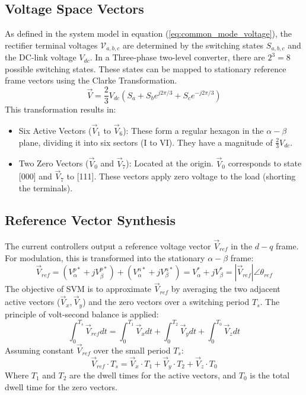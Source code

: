 \subsection{Voltage Space Vectors}
As defined in the system model in equation (\ref{eq:common_mode_voltage}), the rectifier terminal voltages $\mathcal{V}_{a,b,c}$
are determined by the switching states $S_{a,b,c}$ and the DC-link voltage $V_{dc}$. In a Three-phase two-level converter,
there are $2^3 = 8$ possible switching states. These states can be mapped to stationary reference frame vectors using the Clarke Transformation.
\begin{equation}
    \vec{V} = \frac{2}{3} V_{dc} (S_a + S_b e^{j2\pi/3} + S_c e^{-j2\pi/3})
    \label{eq:volage_vector}
\end{equation}
This transformation results in:
\begin{itemize}
    \item Six Active Vectors ($\vec{V}_1$ to $\vec{V}_6$): These form a regular hexagon in the $\alpha-\beta$ plane,
          dividing it into six sectors (I to VI). They have a magnitude of $\frac{2}{3}V_{dc}$.
    \item Two Zero Vectors ($\vec{V}_0$ and $\vec{V}_7$): Located at the origin. $\vec{V}_0$ corresponds to state [000]
          and $\vec{V}_7$ to [111]. These vectors apply zero voltage to the load (shorting the terminals).
\end{itemize}
\subsection{Reference Vector Synthesis}
The current controllers output a reference voltage vector $\vec{V}_{ref}$ in the $d-q$ frame.
For modulation, this is transformed into the stationary $\alpha-\beta$ frame:
\begin{equation}
    \vec{V}_{ref} = (V_{\alpha}^{p*} + jV_{\beta}^{p*})+(V_{\alpha}^{n*} + jV_{\beta}^{n*})=V_{\alpha}^* + jV_{\beta}^* = |\vec{V}_{ref}| \angle \theta_{ref}
    \label{eq:reference_vector}
\end{equation}
The objective of SVM is to approximate $\vec{V}_{ref}$ by averaging the two adjacent active vectors ($\vec{V}_x, \vec{V}_y$)
and the zero vectors over a switching period $T_s$. The principle of volt-second balance is applied:
\begin{equation}
    \int_{0}^{T_s} \vec{V}_{ref} dt = \int_{0}^{T_1} \vec{V}_x dt + \int_{0}^{T_2} \vec{V}_y dt + \int_{0}^{T_0} \vec{V}_z dt
    \label{eq:volt_second_balance}
\end{equation}
Assuming constant $\vec{V}_{ref}$ over the small period $T_s$:
\begin{equation}
    \vec{V}_{ref} \cdot T_s = \vec{V}_x \cdot T_1 + \vec{V}_y \cdot T_2 + \vec{V}_z \cdot T_0
\end{equation}
Where $T_1$ and $T_2$ are the dwell times for the active vectors, and $T_0$ is the total dwell time for the zero vectors.
